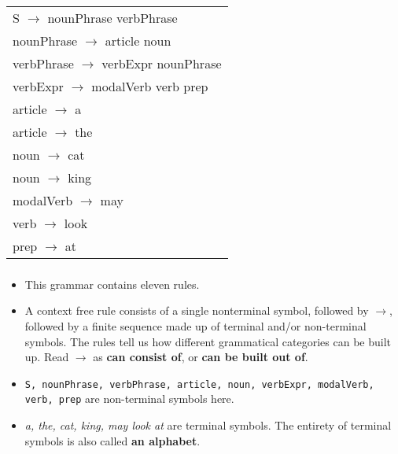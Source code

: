 \begin{frame}
	\frametitle{\insertsection}
	
	\begin{table}
		\centering
		\begin{tabular}{ l }
			\rowcolor{LightGray} S \(\rightarrow \) nounPhrase verbPhrase \\
			\rowcolor{LightGray} nounPhrase \(\rightarrow \) article noun \\
			\rowcolor{LightGray} verbPhrase \(\rightarrow \) verbExpr nounPhrase \\
			\rowcolor{LightGray} verbExpr \(\rightarrow \) modalVerb verb prep \\
			\rowcolor{LightGray} article \(\rightarrow \) a \\
			\rowcolor{LightGray} article \(\rightarrow \) the \\
			\rowcolor{LightGray} noun \(\rightarrow \) cat \\
			\rowcolor{LightGray} noun \(\rightarrow \) king \\
			\rowcolor{LightGray} modalVerb \(\rightarrow \) may \\
			\rowcolor{LightGray} verb \(\rightarrow \) look \\
			\rowcolor{LightGray} prep \(\rightarrow \) at
		\end{tabular}
	\end{table}
\end{frame}


\begin{frame}
	\frametitle{\insertsection}
	
	\begin{itemize}
		\item This grammar contains eleven rules.
		\item A context free rule consists of a single nonterminal symbol, followed by \(\rightarrow \), followed by a finite sequence made up of terminal and/or non-terminal symbols. 
		The rules tell us how different	grammatical categories can be built up. Read \(\rightarrow \) as \textbf{can consist of}, or \textbf{can be built out of}.
		\item \texttt{S, nounPhrase, verbPhrase, article, noun, verbExpr, modalVerb, verb, prep} are non-terminal symbols here.
		\item \textit{a, the, cat, king, may look at} are terminal symbols. The entirety of terminal symbols is also called \textbf{an alphabet}.
	\end{itemize}
	
	
\end{frame}


